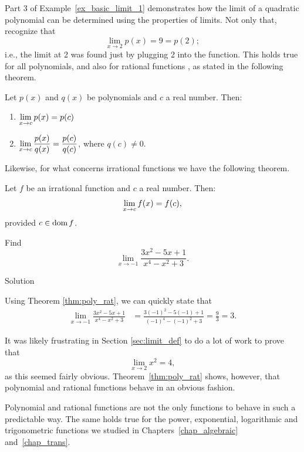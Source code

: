 Part 3 of Example~\ref{ex_basic_limit_1} demonstrates how the limit of a quadratic polynomial can be determined using the properties of limits. Not only that, recognize that $$\lim_{x\to 2} p(x) = 9 = p(2);$$ i.e., the limit at 2 was found just by plugging 2 into the function. This holds true for all polynomials, and also for rational functions , as stated in the following theorem.

\begin{theorem}\label{thm:poly_rat}
Let $p(x)$ and $q(x)$ be polynomials and $c$ a real number. Then:
\begin{enumerate}
\item	$\displaystyle \lim_{x\to c} p(x) = p(c)$
\item	$\displaystyle \lim_{x\to c} \frac{p(x)}{q(x)} = \frac{p(c)}{q(c)}$, where $q(c) \neq 0$.
\end{enumerate}

\end{theorem}

Likewise, for what concerns irrational functions we have the following theorem. 

\begin{theorem}\label{thm:poly_irrat}
Let $f$ be an irrational function and $c$ a real number. Then:
$$
\displaystyle \lim_{x\to c} f(x) = f(c),
$$
provided $c\in\text{dom}{\,}f$. 
\end{theorem}

\ifvc
\begin{example}\label{ex_limit_rat}
Find $$\lim_{x\to -1} \frac{3x^2-5x+1}{x^4-x^2+3}.$$

Solution 

Using Theorem \ref{thm:poly_rat}, we can quickly state that 
	\begin{align*} \lim_{x\to -1}\frac{3x^2-5x+1}{x^4-x^2+3} &= \frac{3(-1)^2-5(-1)+1}{(-1)^4-(-1)^2+3}=\frac{9}{3} =3. 
	\end{align*}
\end{example}
\fi

\ifcourse
It was likely frustrating in Section \ref{sec:limit_def} to do a lot of work to prove that $$\lim_{x\to 2} x^2 = 4,$$ as this seemed fairly obvious. Theorem~\ref{thm:poly_rat} shows, however, that polynomial and rational functions behave in an obvious fashion. \fi

\ifcalculus
Polynomial and rational functions are not the only functions to behave in such a predictable way. The same holds true for the power, exponential, logarithmic and  trigonometric functions we studied in Chapters~\ref{chap_algebraic} and~\ref{chap_trans}.
\fi

